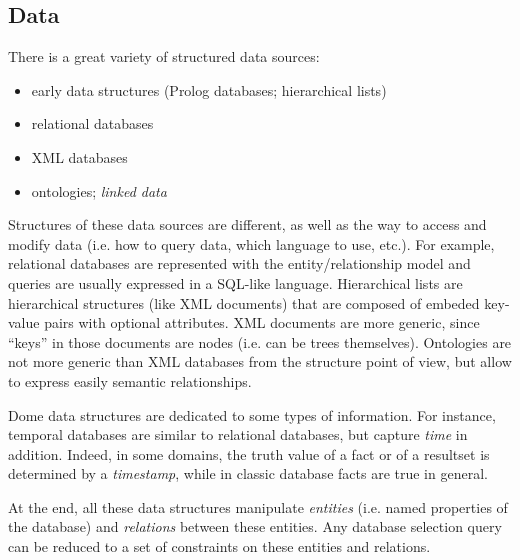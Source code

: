 \documentclass[10pt,journal,letterpaper,compsoc]{IEEEtran}
\newcommand\TODO[1]{{\textcolor{red}{TODO:#1\\}}}
\begin{document}
\subsection{Data}
\label{sec:data}

There is a great variety of structured data sources:
\begin{itemize}
  \item early data structures (Prolog databases; hierarchical lists)
  \item relational databases
  \item XML databases
  \item ontologies; \emph{linked data}
\end{itemize}
Structures of these data sources are different, as well as the way to access and
modify data (i.e. how to query data, which language to use, etc.).
For example, relational databases are represented with the entity/relationship
model and queries are usually expressed in a SQL-like language. Hierarchical
lists are hierarchical structures (like XML documents) that are composed of
embeded key-value pairs with optional attributes. XML documents are more
generic, since ``keys'' in those documents are nodes (i.e. can be trees
themselves). 
Ontologies are not more generic than XML databases from the structure point of
view, but allow to express easily semantic relationships.

Dome data structures are dedicated to some types of information. For instance,
temporal databases are similar to relational databases, but capture \emph{time}
in addition. Indeed, in some domains, the truth value of a fact or of
a resultset is determined by a \emph{timestamp}, while in classic database facts
are true in general. 

At the end, all these data structures manipulate \emph{entities} (i.e. named
properties of the database) and \emph{relations} between these entities.
Any database selection query can be reduced to a set of constraints on these
entities and relations. 
\end{document}
